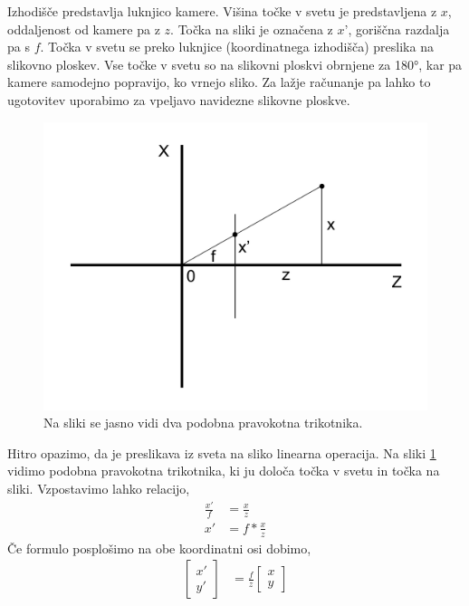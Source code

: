 \documentclass[a4paper, 12pt]{book}
\begin{document}
Izhodišče predstavlja luknjico kamere. Višina točke v svetu je predstavljena z $x$, oddaljenost od kamere pa z $z$. Točka na sliki je označena z $x’$, goriščna razdalja pa s $f$. Točka v svetu se preko luknjice (koordinatnega izhodišča) preslika na slikovno ploskev. Vse točke v svetu so na slikovni ploskvi obrnjene za 180°, kar pa kamere samodejno popravijo, ko vrnejo sliko. Za lažje računanje pa lahko to ugotovitev uporabimo za vpeljavo navidezne slikovne ploskve. 

\begin{figure}[H]
\centering
\includegraphics[width=\textwidth,height=\textheight,keepaspectratio]{similar_triangles_2.png}
\caption{Na sliki se jasno vidi dva podobna pravokotna trikotnika.}
\label{similar2}
\end{figure}

Hitro opazimo, da je preslikava iz sveta na sliko linearna operacija. Na sliki \ref{similar2} vidimo podobna pravokotna trikotnika, ki ju določa točka v svetu in točka na sliki. Vzpostavimo lahko relacijo,
\begin{align}
\frac{x'}{f} &= \frac{x}{z} \\
x' &= f * \frac{x}{z}
\end{align}
Če formulo posplošimo na obe koordinatni osi dobimo,
\begin{align}
\begin{bmatrix}
x' \\
y'
\end{bmatrix}
&= \frac{f}{z}
\begin{bmatrix}
x \\
y
\end{bmatrix}
\label{simplemodeleq}
\end{align}
\end{document}
